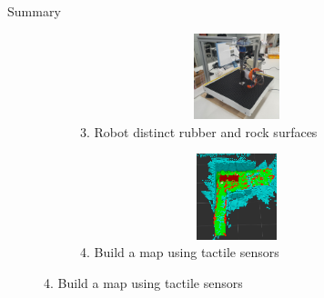 \documentclass[aspectratio=169,xcolor=table]{beamer}
\newcommand{\fbckg}[1]{\usebackgroundtemplate{\texttt{[image: \#1]}}}%
\begin{document}
\begin{frame}[t]{Summary}
\begin{figure}[H]
        \begin{subfigure}[t]{0.49\textwidth}
            \centering\includegraphics[height=2.5cm,width=1\textwidth,keepaspectratio]{s_shape_leg/s_leg_setup.JPG}
            \caption*{3. Robot distinct rubber and rock surfaces}
        \end{subfigure}
        \begin{subfigure}[t]{0.49\textwidth}
            \centering\includegraphics[height=2.5cm,width=1\textwidth,keepaspectratio]{conv_concave.png}
            \caption*{4. Build a map using tactile sensors}
        \end{subfigure}
    \end{figure}
\end{frame}

\end{document}
